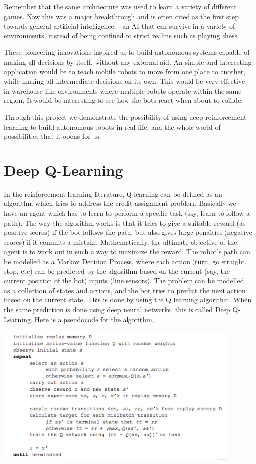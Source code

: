 \documentclass[12pt]{extreport}
\begin{document}
Remember that the same architecture was used to learn a variety of different games. Now this was a major breakthrough and is often cited as the first step towards general artificial intelligence – an AI that can survive in a variety of environments, instead of being confined to strict realms such as playing chess.

These pioneering innovations inspired us to build autonomous systems capable of making all decisions by itself, without any external aid. An simple and interesting application would be to teach mobile robots to move from one place to another, while making all intermediate decisions on its own. This would be very effective in warehouse like environments where multiple robots operate within the same region. It would be interesting to see how the bots react when about to collide.

Through this project we demonstrate the possibility of using deep reinforcement learning to build autonomous robots in real life, and the whole world of possibilities that it opens for us.


\chapter{Deep Q-Learning}

In the reinforcement learning literature, Q-learning can be defined as an algorithm which tries to address the credit assignment problem. Basically we have an agent which has to learn to perform a specific task (say, learn to follow a path). The way the algorithm works is that it tries to give a suitable reward (as positive scores) if the bot follows the path, but also gives large penalties (negative scores) if it commits a mistake. Mathematically, the ultimate objective of the agent is to work out in such a way to maximize the reward.
The robot’s path can be modelled as a Markov Decision Process, where each action (turn, go straight, stop, etc) can be predicted by the algorithm based on the current (say, the current position of the bot) inputs (line sensors). The problem can be modelled as a collection of states and actions, and the bot tries to predict the next action based on the current state. This is done by using the Q learning algorithm. When the same prediction is done using deep neural networks, this is called Deep Q-Learning.
Here is a pseudocode for the algorithm,

\begin{center}
	\includegraphics[width=0.9\textwidth]{deepQ.png}
\end{center}
\end{document}
